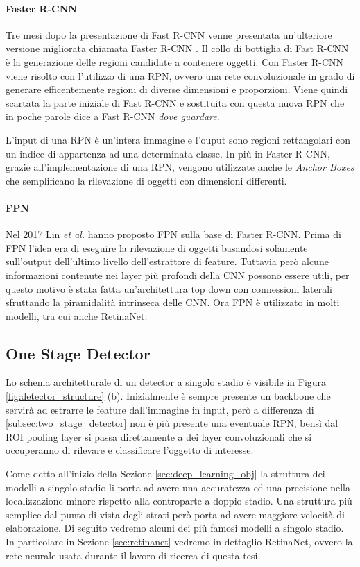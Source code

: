 \paragraph{Faster R-CNN}
Tre mesi dopo la presentazione di Fast R-CNN venne presentata un'ulteriore versione migliorata chiamata Faster R-CNN \cite{ren2015faster}. Il collo di bottiglia di Fast R-CNN è la generazione delle regioni candidate a contenere oggetti. Con Faster R-CNN viene risolto con l'utilizzo di una \ac{RPN}, ovvero una rete convoluzionale in grado di generare efficentemente regioni di diverse dimensioni e proporzioni. Viene quindi scartata la parte iniziale di Fast R-CNN e sostituita con questa nuova \ac{RPN} che in poche parole dice a Fast R-CNN \textit{dove guardare}.

L'input di una \ac{RPN} è un'intera immagine e l'ouput sono regioni rettangolari con un indice di appartenza ad una determinata classe. 
In più in Faster R-CNN, grazie all'implementazione di una \ac{RPN}, vengono utilizzate anche le \textit{Anchor Boxes} che semplificano la rilevazione di oggetti con dimensioni differenti. 
\paragraph{FPN}
Nel 2017 Lin \textit{et al.} hanno proposto \ac{FPN} \cite{lin2017feature} sulla base di Faster R-CNN. Prima di \ac{FPN} l'idea era di eseguire la rilevazione di oggetti basandosi solamente sull'output dell'ultimo livello dell'estrattore di feature. Tuttavia però alcune informazioni contenute nei layer più profondi della \ac{CNN} possono essere utili, per questo motivo è stata fatta un'architettura top down con connessioni laterali sfruttando la piramidalità intrinseca delle \ac{CNN}. Ora \ac{FPN} è utilizzato in molti modelli, tra cui anche RetinaNet. 
\subsection{One Stage Detector}
\label{subsec:one_stage_detector}
Lo schema architetturale di un detector a singolo stadio è visibile in Figura \ref{fig:detector_structure} (b). Inizialmente è sempre presente un backbone che servirà ad estrarre le feature dall'immagine in input, però a differenza di \ref{subsec:two_stage_detector} non è più presente una eventuale \ac{RPN}, bensì dal \ac{ROI} pooling layer si passa direttamente a dei layer convoluzionali che si occuperanno di rilevare e classificare l'oggetto di interesse. 

Come detto all'inizio della Sezione \ref{sec:deep_learning_obj} la struttura dei modelli a singolo stadio li porta ad avere una accuratezza ed una precisione nella localizzazione minore rispetto alla controparte a doppio stadio. Una struttura più semplice dal punto di vista degli strati però porta ad avere maggiore velocità di elaborazione. Di seguito vedremo alcuni dei più famosi modelli a singolo stadio. In particolare in Sezione \ref{sec:retinanet} vedremo in dettaglio RetinaNet, ovvero la rete neurale usata durante il lavoro di ricerca di questa tesi.  
